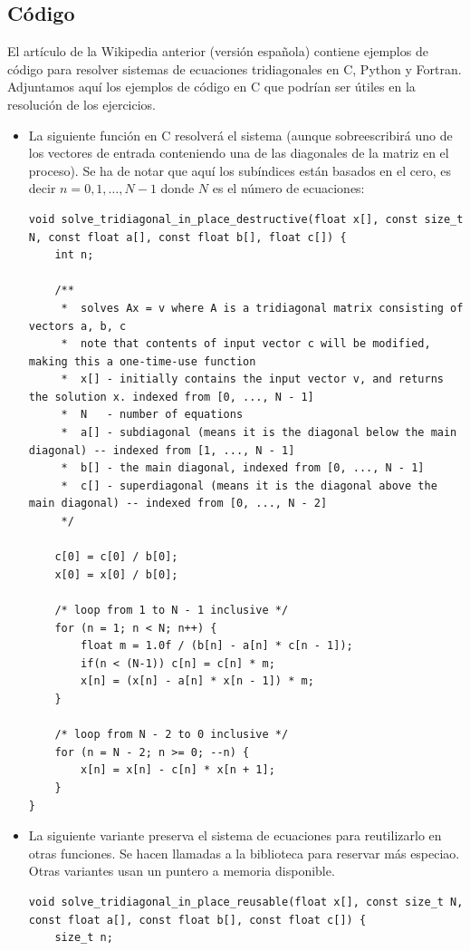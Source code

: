 \documentclass[12pt]{iopart}
\begin{document}
\subsection{Código}

El artículo de la Wikipedia anterior (versión española) contiene ejemplos de código para resolver sistemas de ecuaciones tridiagonales en C, Python y Fortran. Adjuntamos aquí los ejemplos de código en C que podrían ser útiles en la resolución de los ejercicios.
\begin{itemize}
\item La siguiente función en C resolverá el sistema (aunque sobreescribirá uno de los vectores de entrada conteniendo una de las diagonales de la matriz en el proceso). Se ha de notar que aquí los subíndices están basados en el cero, es decir ${\displaystyle n=0,1,\dots ,N-1}$ donde $N$ es el número de ecuaciones:
\begin{lstlisting}
void solve_tridiagonal_in_place_destructive(float x[], const size_t N, const float a[], const float b[], float c[]) {
    int n;
    
    /**
     *  solves Ax = v where A is a tridiagonal matrix consisting of vectors a, b, c
     *  note that contents of input vector c will be modified, making this a one-time-use function
     *  x[] - initially contains the input vector v, and returns the solution x. indexed from [0, ..., N - 1]
     *  N   - number of equations
     *  a[] - subdiagonal (means it is the diagonal below the main diagonal) -- indexed from [1, ..., N - 1]
     *  b[] - the main diagonal, indexed from [0, ..., N - 1]
     *  c[] - superdiagonal (means it is the diagonal above the main diagonal) -- indexed from [0, ..., N - 2]
     */
    
    c[0] = c[0] / b[0];
    x[0] = x[0] / b[0];
    
    /* loop from 1 to N - 1 inclusive */
    for (n = 1; n < N; n++) {
        float m = 1.0f / (b[n] - a[n] * c[n - 1]);
        if(n < (N-1)) c[n] = c[n] * m;
        x[n] = (x[n] - a[n] * x[n - 1]) * m;
    }
    
    /* loop from N - 2 to 0 inclusive */
    for (n = N - 2; n >= 0; --n) {
        x[n] = x[n] - c[n] * x[n + 1];
    }
}
\end{lstlisting}
\item La siguiente variante preserva el sistema de ecuaciones para reutilizarlo en otras funciones. Se hacen llamadas a la biblioteca para reservar más especiao. Otras variantes usan un puntero a memoria disponible.
\begin{lstlisting}
void solve_tridiagonal_in_place_reusable(float x[], const size_t N, const float a[], const float b[], const float c[]) {
    size_t n;
    

\end{lstlisting}
\end{itemize}
\end{document}

